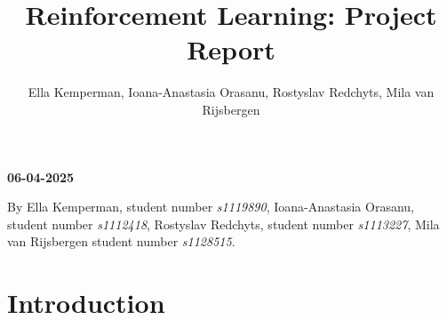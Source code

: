 \documentclass{class}
\title{Reinforcement Learning: Project Report}
\author{Ella Kemperman, Ioana-Anastasia Orasanu, Rostyslav Redchyts, Mila van Rijsbergen}
\newcommand{\makemytitle}{\begin{center}\Large\textbf{\THETITLE}\end{center}}
\begin{document}
\makemytitle
\begin{center}
    \textbf{06-04-2025}\\
\end{center}

\noindent By Ella Kemperman, student number \textit{s1119890}, Ioana-Anastasia Orasanu, student number \textit{s1112418}, Rostyslav Redchyts, student number \textit{s1113227}, Mila van Rijsbergen student number \textit{s1128515}.

\section{Introduction}

\end{document}
